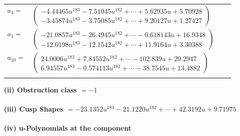 \documentclass[1p]{elsarticle_modified}
\theoremstyle{definition}
\begin{document}
\begin{tabular}{m{7pt} m{180pt} m{7pt} m{180pt} }
\flushright $a_{4}=$&$\begin{pmatrix}-4.44465 u^{183}-7.51045 u^{182}+\cdots+5.62935 u+5.70928\\-3.45874 u^{183}-3.75085 u^{182}+\cdots+9.20127 u+1.27427\end{pmatrix}$ \\
\flushright $a_{1}=$&$\begin{pmatrix}-21.0857 u^{183}-26.4945 u^{182}+\cdots-0.618143 u+16.9348\\-12.0198 u^{183}-12.1542 u^{182}+\cdots+11.9164 u+3.30388\end{pmatrix}$ \\
\flushright $a_{10}=$&$\begin{pmatrix}24.0006 u^{183}+7.84552 u^{182}+\cdots-102.839 u+29.2947\\6.94557 u^{183}-0.574113 u^{182}+\cdots-38.7545 u+13.4882\end{pmatrix}$\\&\end{tabular}
\flushleft \textbf{(ii) Obstruction class $= -1$}\\~\\
\flushleft \textbf{(iii) Cusp Shapes $= -23.1352 u^{183}-21.1220 u^{182}+\cdots+42.3192 u+9.71975$}\\~\\
\newpage\renewcommand{\arraystretch}{1}
\flushleft \textbf{(iv) u-Polynomials at the component}\newline \\
\end{document}
